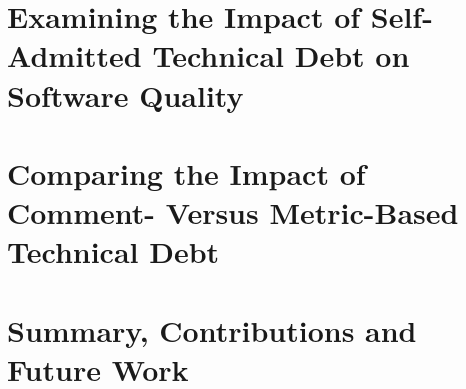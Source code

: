 \documentclass[12pt]{report}
\begin{document}
\chapter{Examining the Impact of Self-Admitted Technical Debt on Software Quality}
\label{chapter3}


\chapter{Comparing the Impact of Comment- Versus Metric-Based Technical Debt}
\label{chapter4}


\chapter{Summary, Contributions and Future Work}
\label{conclusion}



\begin{appendices}
	\label{appendix}
	
\end{appendices}

  

\end{document}

